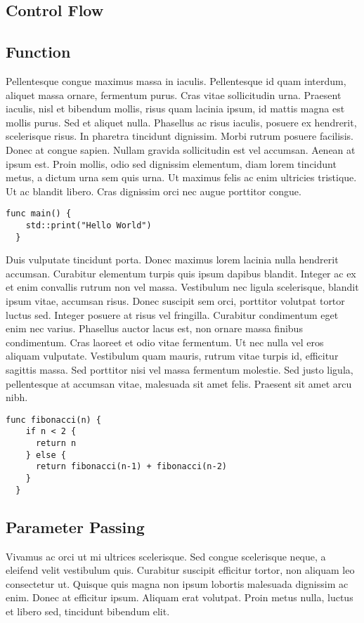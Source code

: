 \subsection{Control Flow}


\subsection{Function}
Pellentesque congue maximus massa in iaculis. Pellentesque id quam interdum, aliquet massa ornare, fermentum purus. Cras vitae sollicitudin urna. Praesent iaculis, nisl et bibendum mollis, risus quam lacinia ipsum, id mattis magna est mollis purus. Sed et aliquet nulla. Phasellus ac risus iaculis, posuere ex hendrerit, scelerisque risus. In pharetra tincidunt dignissim. Morbi rutrum posuere facilisis. Donec at congue sapien. Nullam gravida sollicitudin est vel accumsan. Aenean at ipsum est. Proin mollis, odio sed dignissim elementum, diam lorem tincidunt metus, a dictum urna sem quis urna. Ut maximus felis ac enim ultricies tristique. Ut ac blandit libero. Cras dignissim orci nec augue porttitor congue.
\begin{lstlisting}[language=Lucy]
  func main() {
    std::print("Hello World")
  }
\end{lstlisting}
Duis vulputate tincidunt porta. Donec maximus lorem lacinia nulla hendrerit accumsan. Curabitur elementum turpis quis ipsum dapibus blandit. Integer ac ex et enim convallis rutrum non vel massa. Vestibulum nec ligula scelerisque, blandit ipsum vitae, accumsan risus. Donec suscipit sem orci, porttitor volutpat tortor luctus sed. Integer posuere at risus vel fringilla. Curabitur condimentum eget enim nec varius. Phasellus auctor lacus est, non ornare massa finibus condimentum. Cras laoreet et odio vitae fermentum. Ut nec nulla vel eros aliquam vulputate. Vestibulum quam mauris, rutrum vitae turpis id, efficitur sagittis massa. Sed porttitor nisi vel massa fermentum molestie. Sed justo ligula, pellentesque at accumsan vitae, malesuada sit amet felis. Praesent sit amet arcu nibh.
\begin{lstlisting}[language=Lucy]
  func fibonacci(n) {
    if n < 2 {
      return n
    } else {
      return fibonacci(n-1) + fibonacci(n-2)
    }
  }
\end{lstlisting}

\subsection{Parameter Passing}
Vivamus ac orci ut mi ultrices scelerisque. Sed congue scelerisque neque, a eleifend velit vestibulum quis. Curabitur suscipit efficitur tortor, non aliquam leo consectetur ut. Quisque quis magna non ipsum lobortis malesuada dignissim ac enim. Donec at efficitur ipsum. Aliquam erat volutpat. Proin metus nulla, luctus et libero sed, tincidunt bibendum elit.


